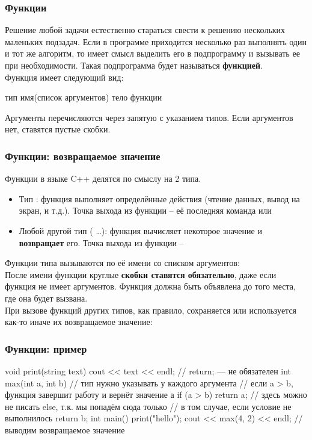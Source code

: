 

\begin{frame}[fragile]
	\frametitle{Функции}
	Решение любой задачи естественно стараться свести к решению нескольких
	маленьких подзадач. Если в программе приходится несколько раз выполнять один и
	тот же алгоритм, то имеет смысл выделить его в подпрограмму и вызывать ее при
	необходимости. Такая подпрограмма будет называться {\bf функцией}. \\

	Функция имеет следующий вид:
	\begin{code}
тип имя(список аргументов)
{
	тело функции
}
	\end{code}

	Аргументы перечисляются через запятую с указанием типов. Если аргументов нет,
	ставятся пустые скобки.
\end{frame}

\begin{frame}
	\frametitle{Функции: возвращаемое значение}
	Функции в языке C++ делятся по смыслу на 2 типа.
	\begin{itemize}
		\item Тип : функция выполняет определённые действия (чтение
			данных, вывод на экран, и т.д.). Точка выхода из функции -- её последняя
			команда или 
		\item Любой другой тип ( \dots): функция вычисляет
			некоторое значение и {\bf возвращает} его. Точка выхода из функции --
	\end{itemize}
	Функции типа  вызываются по её имени со списком аргументов:
	\\
	После имени функции круглые {\bf скобки ставятся обязательно}, даже если
	функция не имеет аргументов. Функция должна быть объявлена до того места, где
	она будет вызвана. \\

	При вызове функций других типов, как правило, сохраняется или используется
	как-то иначе их возвращаемое значение: \\
\end{frame}

\begin{frame}[fragile]
	\frametitle{Функции: пример}
	\begin{code}
void print(string text)
{
	cout << text << endl;
	// return; — не обязателен
}
int max(int a, int b) // тип нужно указывать у каждого аргумента
{
	// если a > b, функция завершит работу и вернёт значение а
	if (a > b) return a;
	// здесь можно не писать else, т.к. мы попадём сюда только
	// в том случае, если условие не выполнилось
	return b;
}
int main()
{
	print("hello");
	cout << max(4, 2) << endl; // выводим возвращаемое значение
}
	\end{code}
\end{frame}

